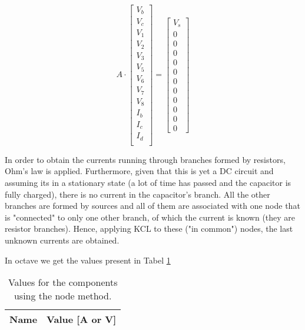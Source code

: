 \begin{equation}
    A \cdot
  \begin{bmatrix}
    V_b\\
    V_c\\
    V_1\\
    V_2\\
    V_3\\
    V_5\\
    V_6\\
    V_7\\
    V_8\\
    I_b\\
    I_c\\
    I_d\\
  \end{bmatrix}
    =
  \begin{bmatrix}
    V_s\\0\\0\\0\\0\\0\\0\\0\\0\\0\\0\\0
  \end{bmatrix}
  \label{eq:nodal_matrix_syst}
\end{equation}

In order to obtain the currents running through branches formed by resistors, Ohm's law is applied. Furthermore, given that this is yet a DC circuit and assuming its in a stationary state (a lot of time has passed and the capacitor is fully charged), there is no current in the capacitor's branch. All the other branches are formed by sources and all of them are associated with one node that is "connected" to only one other branch, of which the current is known (they are resistor branches). Hence, applying KCL to these ("in common") nodes, the last unknown currents are obtained.

In octave we get the values present in Tabel \ref{tab:op}


\begin{table}[h]
  \centering
  \begin{tabular}{|l|r|}
    \hline    
    {\bf Name} & {\bf Value [A or V]} \\ \hline
    
  \end{tabular}
  \caption{Values for the components using the node method.}
  \label{tab:op}
\end{table}



